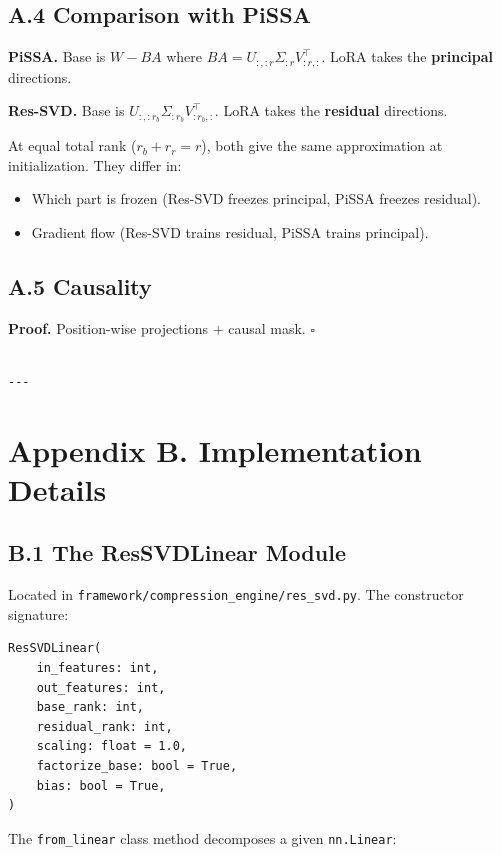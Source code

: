 \subsection{A.4 Comparison with PiSSA}

\textbf{PiSSA.} Base is $W - BA$ where $BA = U_{:, :r} \Sigma_{:r} V_{:r, :}^\top$. 
LoRA takes the \textbf{principal} directions.

\textbf{Res-SVD.} Base is $U_{:, :r_b} \Sigma_{:r_b} V_{:r_b, :}^\top$. LoRA 
takes the \textbf{residual} directions.

At equal total rank ($r_b + r_r = r$), both give the same approximation 
at initialization. They differ in:
\begin{itemize}
\item Which part is frozen (Res-SVD freezes principal, PiSSA freezes residual).
\item Gradient flow (Res-SVD trains residual, PiSSA trains principal).

\end{itemize}
\subsection{A.5 Causality}

\textbf{Proof.} Position-wise projections + causal mask. $\square$
\begin{lstlisting}

---
\end{lstlisting}

\section{Appendix B. Implementation Details}

\subsection{B.1 The ResSVDLinear Module}

Located in \texttt{framework/compression\_engine/res\_svd.py}. The constructor 
signature:

\begin{lstlisting}
ResSVDLinear(
    in_features: int,
    out_features: int,
    base_rank: int,
    residual_rank: int,
    scaling: float = 1.0,
    factorize_base: bool = True,
    bias: bool = True,
)
\end{lstlisting}

The \texttt{from\_linear} class method decomposes a given \texttt{nn.Linear}:

